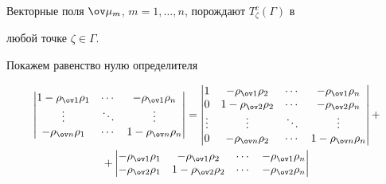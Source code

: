 \begin{lem} 


Векторные поля $\ov\mu_m$, $m=1,\dotsc,n$, порождают $T^c_\zeta(\Gamma)$ в 


любой точке $\zeta\in\Gamma$. 


\end{lem} 


 


\begin{pf} 


Покажем равенство нулю определителя 


\begin{gather*} 


\begin{vmatrix} 


1-\rho_{\ov1}\rho_1 & \dotsb & -\rho_{\ov1}\rho_n \\ 


\vdots & \ddots & \vdots \\ 


-\rho_{\ov n}\rho_1 & \dotsb & 1-\rho_{\ov n}\rho_n 


\end{vmatrix} 


= 


\begin{vmatrix} 


1 & -\rho_{\ov 1}\rho_2 & \dotsb & -\rho_{\ov 1}\rho_n\\ 


0 & 1-\rho_{\ov 2}\rho_2 & \dotsb & -\rho_{\ov 2}\rho_n \\ 


\vdots & \vdots & \ddots & \vdots \\ 


0 & -\rho_{\ov n}\rho_2 & \dotsb & 1-\rho_{\ov n}\rho_n 


\end{vmatrix} 


+ \\ 


% 


+ 


\begin{vmatrix} 


-\rho_{\ov 1}\rho_1 & -\rho_{\ov 1}\rho_2 & \dotsb & 


-\rho_{\ov 1}\rho_n \\ 


-\rho_{\ov 2}\rho_1 & 1-\rho_{\ov 2}\rho_2 & \dotsb & 


-\rho_{\ov 2}\rho_n \\ 



\end{vmatrix}
\end{gather*}
\end{pf}
